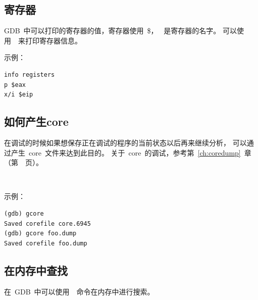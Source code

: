\noindent
{}

\paramdesc{}

\noindent
{}

\paramdesc{}

\subsection{寄存器}

GDB~中可以打印的寄存器的值，寄存器使用~\$，
~是寄存器的名字。
可以使用~~来打印寄存器信息。

\noindent
{}


\noindent
{}


示例：

\begin{lstlisting}
info registers
p $eax
x/i $eip
\end{lstlisting}

\subsection{如何产生core}

在调试的时候如果想保存正在调试的程序的当前状态以后再来继续分析，
可以通过产生~core~文件来达到此目的。
关于~core~的调试，参考第~\ref{ch:coredump}~章（第~\pageref{ch:coredump}~页）。

\noindent
{}\\


示例：
\begin{lstlisting}
(gdb) gcore
Saved corefile core.6945
(gdb) gcore foo.dump
Saved corefile foo.dump
\end{lstlisting}


\subsection{在内存中查找}

在~GDB~中可以使用~~命令在内存中进行搜索。

